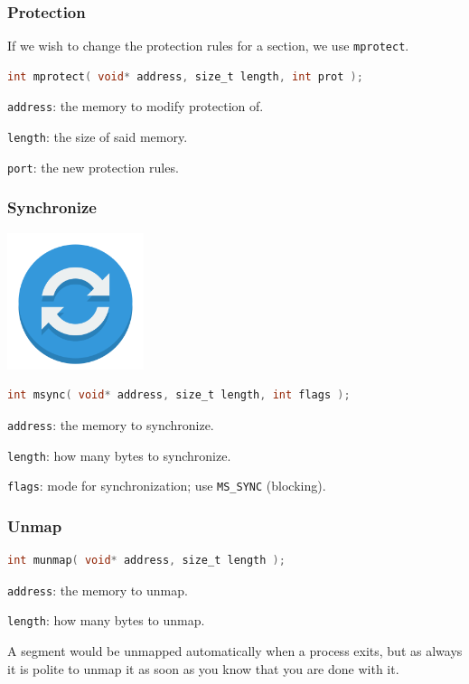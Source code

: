 \begin{frame}[fragile]
	\frametitle{Protection}

	If we wish to change the protection rules for a section, we use \texttt{mprotect}.

	\begin{lstlisting}[language=C]
int mprotect( void* address, size_t length, int prot );
\end{lstlisting}

	\texttt{address}: the memory to modify protection of.

	\texttt{length}: the size of said memory.

	\texttt{port}: the new protection rules.

\end{frame}


\begin{frame}[fragile]
	\frametitle{Synchronize}

	\begin{center}
		\includegraphics[width=0.3\textwidth]{images/sync-icon.png}
	\end{center}

	\begin{lstlisting}[language=C]
int msync( void* address, size_t length, int flags );
\end{lstlisting}

	\texttt{address}: the memory to synchronize.

	\texttt{length}: how many bytes to synchronize.

	\texttt{flags}: mode for synchronization; use \texttt{MS\_SYNC} (blocking).

\end{frame}


\begin{frame}[fragile]
	\frametitle{Unmap}

	\begin{lstlisting}[language=C]
int munmap( void* address, size_t length );
\end{lstlisting}

	\texttt{address}: the memory to unmap.

	\texttt{length}: how many bytes to unmap.

	A segment would be unmapped automatically when a process exits, but as always it is polite to unmap it as soon as you know that you are done with it.

\end{frame}


